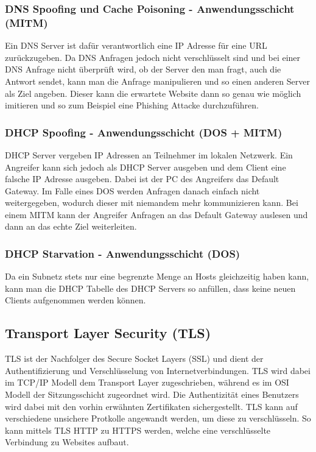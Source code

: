 \documentclass{article}
\begin{document}
	  \subsubsection{DNS Spoofing und Cache Poisoning - Anwendungsschicht (MITM)}
	  Ein DNS Server ist dafür verantwortlich eine IP Adresse für eine URL zurückzugeben. Da DNS Anfragen jedoch nicht verschlüsselt sind und bei einer DNS Anfrage nicht überprüft wird, ob der Server den man fragt, auch die Antwort sendet, kann man die Anfrage manipulieren und so einen anderen Server als Ziel angeben. Dieser kann die erwartete Website dann so genau wie möglich imitieren und so zum Beispiel eine Phishing Attacke durchzuführen.
	  \subsubsection{DHCP Spoofing - Anwendungsschicht (DOS + MITM)}
	  DHCP Server vergeben IP Adressen an Teilnehmer im lokalen Netzwerk. Ein Angreifer kann sich jedoch als DHCP Server ausgeben und dem Client eine falsche IP Adresse ausgeben. Dabei ist der PC des Angreifers das Default Gateway. Im Falle eines DOS werden Anfragen danach einfach nicht weitergegeben, wodurch dieser mit niemandem mehr kommunizieren kann. Bei einem MITM kann der Angreifer Anfragen an das Default Gateway auslesen und dann an das echte Ziel weiterleiten.
	  \subsubsection{DHCP Starvation - Anwendungsschicht (DOS)}
	  Da ein Subnetz stets nur eine begrenzte Menge an Hosts gleichzeitig haben kann, kann man die DHCP Tabelle des DHCP Servers so anfüllen, dass keine neuen Clients aufgenommen werden können.
	  \subsection{Transport Layer Security (TLS)}
	  TLS ist der Nachfolger des Secure Socket Layers (SSL) und dient der Authentifizierung und Verschlüsselung von Internetverbindungen. TLS wird dabei im TCP/IP Modell dem Transport Layer zugeschrieben, während es im OSI Modell der Sitzungsschicht zugeordnet wird. Die Authentizität eines Benutzers wird dabei mit den vorhin erwähnten Zertifikaten sichergestellt. TLS kann auf verschiedene unsichere Protkolle angewandt werden, um diese zu verschlüsseln. So kann mittels TLS HTTP zu HTTPS werden, welche eine verschlüsselte Verbindung zu Websites aufbaut.
\end{document}

